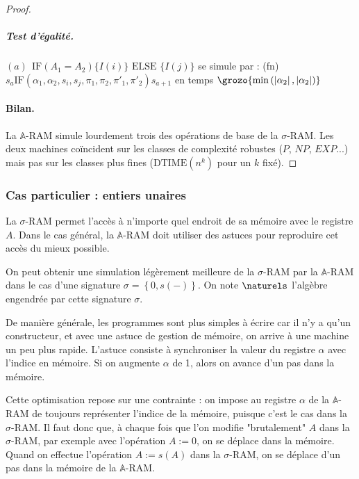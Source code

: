 \documentclass{report}
\newcommand{\sRAMifc}[2]{\text{IF} (A_1=A_2) \{I( #1 )\} \text{ ELSE } \{I( #2 )\}}
\newcommand{\bbA}{\mathbb{A}}
\begin{document}
\begin{proof}
						\subparagraph{Test d'égalité.}
						$(a) \:\: \sRAMifc{i}{j}$ se simule par : (fn) $s_a \text{IF}\left( \alpha_1, \alpha_2, s_i, s_j, \pi_1, \pi_2, \pi'_1, \pi'_2 \right) s_{a+1}$ en temps $\grozo{\min\left( \left| \alpha_2\right|, \left| \alpha_2 \right| \right)}$
						
						
					\paragraph{Bilan.}
					La $\bbA$-RAM simule lourdement trois des opérations de base de la $\sigma$-RAM. Les deux machines coïncident sur les classes de complexité robustes ($P$, $NP$, $EXP$...) mais pas sur les classes plus fines ($\text{DTIME}(n^k)$ pour un $k$ fixé).
				\end{proof}
				
				
				
				
			\subsubsection{Cas particulier : entiers unaires}
			\label{subsubsec:sim_succ_RAM_N_RAM}
							
				La $\sigma$-RAM permet l'accès à n'importe quel endroit de sa mémoire avec le registre $A$. Dans le cas général, la $\bbA$-RAM doit utiliser des astuces pour reproduire cet accès du mieux possible. 
				
				On peut obtenir une simulation légèrement meilleure de la $\sigma$-RAM par la $\bbA$-RAM dans le cas d'une signature $\sigma = \left\lbrace 0, s(-)\right\rbrace$. On note $\naturels$ l'algèbre engendrée par cette signature $\sigma$.
				
				De manière générale, les programmes sont plus simples à écrire car il n'y a qu'un constructeur, et avec une astuce de gestion de mémoire, on arrive à une machine un peu plus rapide. L'astuce consiste à synchroniser la valeur du registre $\alpha$ avec l'indice en mémoire. Si on augmente $\alpha$ de 1, alors on avance d'un pas dans la mémoire. 
				
				Cette optimisation repose sur une contrainte : on impose au registre $\alpha$ de la $\bbA$-RAM de toujours représenter l'indice de la mémoire, puisque c'est le cas dans la $\sigma$-RAM. Il faut donc que, à chaque fois que l'on modifie "brutalement" $A$ dans la $\sigma$-RAM, par exemple avec l'opération $A :=0$, on se déplace dans la mémoire. Quand on effectue l'opération $A:=s(A)$ dans la $\sigma$-RAM, on se déplace d'un pas dans la mémoire de la $\bbA$-RAM. 
				
\end{document}
